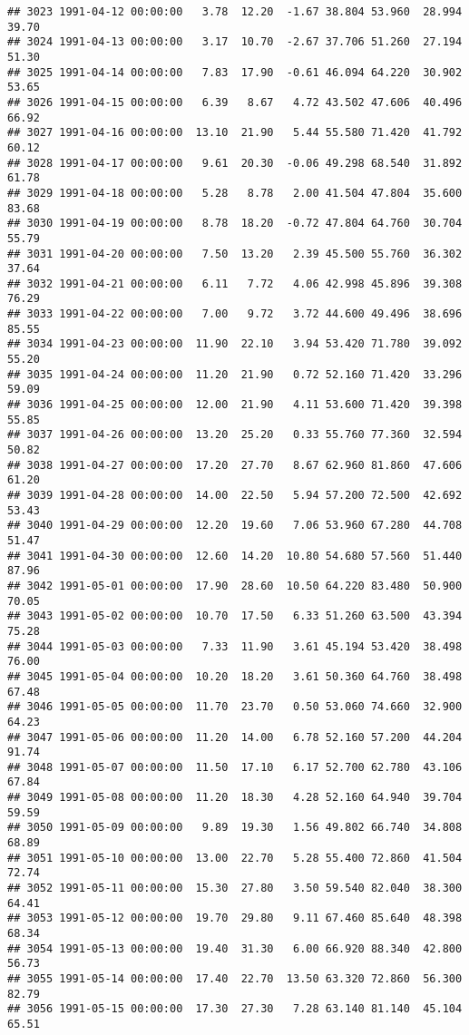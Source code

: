 \documentclass{article}\usepackage{graphicx, color}
\makeatletter
\newenvironment{kframe}{%
 \def\at@end@of@kframe{}%
 \ifinner\ifhmode%
  \def\at@end@of@kframe{\end{minipage}}%
  \begin{minipage}{\columnwidth}%
 \fi\fi%
 \def\FrameCommand##1{\hskip\@totalleftmargin \hskip-\fboxsep
 \colorbox{shadecolor}{##1}\hskip-\fboxsep
     \hskip-\linewidth \hskip-\@totalleftmargin \hskip\columnwidth}%
 \MakeFramed {\advance\hsize-\width
   \@totalleftmargin\z@ \linewidth\hsize
   \@setminipage}}%
 {\par\unskip\endMakeFramed%
 \at@end@of@kframe}
\newenvironment{knitrout}{}{} %
\makeatother
\begin{document}
\begin{knitrout}
\begin{kframe}
\begin{verbatim}
## 3023 1991-04-12 00:00:00   3.78  12.20  -1.67 38.804 53.960  28.994  39.70
## 3024 1991-04-13 00:00:00   3.17  10.70  -2.67 37.706 51.260  27.194  51.30
## 3025 1991-04-14 00:00:00   7.83  17.90  -0.61 46.094 64.220  30.902  53.65
## 3026 1991-04-15 00:00:00   6.39   8.67   4.72 43.502 47.606  40.496  66.92
## 3027 1991-04-16 00:00:00  13.10  21.90   5.44 55.580 71.420  41.792  60.12
## 3028 1991-04-17 00:00:00   9.61  20.30  -0.06 49.298 68.540  31.892  61.78
## 3029 1991-04-18 00:00:00   5.28   8.78   2.00 41.504 47.804  35.600  83.68
## 3030 1991-04-19 00:00:00   8.78  18.20  -0.72 47.804 64.760  30.704  55.79
## 3031 1991-04-20 00:00:00   7.50  13.20   2.39 45.500 55.760  36.302  37.64
## 3032 1991-04-21 00:00:00   6.11   7.72   4.06 42.998 45.896  39.308  76.29
## 3033 1991-04-22 00:00:00   7.00   9.72   3.72 44.600 49.496  38.696  85.55
## 3034 1991-04-23 00:00:00  11.90  22.10   3.94 53.420 71.780  39.092  55.20
## 3035 1991-04-24 00:00:00  11.20  21.90   0.72 52.160 71.420  33.296  59.09
## 3036 1991-04-25 00:00:00  12.00  21.90   4.11 53.600 71.420  39.398  55.85
## 3037 1991-04-26 00:00:00  13.20  25.20   0.33 55.760 77.360  32.594  50.82
## 3038 1991-04-27 00:00:00  17.20  27.70   8.67 62.960 81.860  47.606  61.20
## 3039 1991-04-28 00:00:00  14.00  22.50   5.94 57.200 72.500  42.692  53.43
## 3040 1991-04-29 00:00:00  12.20  19.60   7.06 53.960 67.280  44.708  51.47
## 3041 1991-04-30 00:00:00  12.60  14.20  10.80 54.680 57.560  51.440  87.96
## 3042 1991-05-01 00:00:00  17.90  28.60  10.50 64.220 83.480  50.900  70.05
## 3043 1991-05-02 00:00:00  10.70  17.50   6.33 51.260 63.500  43.394  75.28
## 3044 1991-05-03 00:00:00   7.33  11.90   3.61 45.194 53.420  38.498  76.00
## 3045 1991-05-04 00:00:00  10.20  18.20   3.61 50.360 64.760  38.498  67.48
## 3046 1991-05-05 00:00:00  11.70  23.70   0.50 53.060 74.660  32.900  64.23
## 3047 1991-05-06 00:00:00  11.20  14.00   6.78 52.160 57.200  44.204  91.74
## 3048 1991-05-07 00:00:00  11.50  17.10   6.17 52.700 62.780  43.106  67.84
## 3049 1991-05-08 00:00:00  11.20  18.30   4.28 52.160 64.940  39.704  59.59
## 3050 1991-05-09 00:00:00   9.89  19.30   1.56 49.802 66.740  34.808  68.89
## 3051 1991-05-10 00:00:00  13.00  22.70   5.28 55.400 72.860  41.504  72.74
## 3052 1991-05-11 00:00:00  15.30  27.80   3.50 59.540 82.040  38.300  64.41
## 3053 1991-05-12 00:00:00  19.70  29.80   9.11 67.460 85.640  48.398  68.34
## 3054 1991-05-13 00:00:00  19.40  31.30   6.00 66.920 88.340  42.800  56.73
## 3055 1991-05-14 00:00:00  17.40  22.70  13.50 63.320 72.860  56.300  82.79
## 3056 1991-05-15 00:00:00  17.30  27.30   7.28 63.140 81.140  45.104  65.51

\end{verbatim}
\end{kframe}
\end{knitrout}
\end{document}
